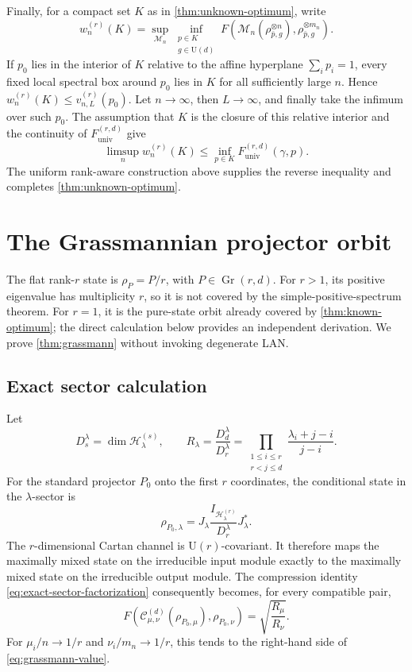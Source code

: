 \documentclass[11pt]{article}
\theoremstyle{remark}
\theoremstyle{plain}
\newcommand{\cC}{\mathcal C}
\newcommand{\cH}{\mathcal H}
\newcommand{\cM}{\mathcal M}
\newcommand{\U}{\mathrm U}
\newcommand{\Gr}{\operatorname{Gr}}
\newcommand{\ot}{\otimes}
\newcommand{\Funiv}{F_{\mathrm{univ}}}
\begin{document}
Finally, for a compact set \(K\) as in \cref{thm:unknown-optimum}, write
\[
  w_n^{(r)}(K)=\sup_{\cM_n}
  \inf_{\substack{p\in K\\g\in\U(d)}}
  F\!\left(\cM_n(\rho_{\bar p,g}^{\ot n}),
             \rho_{\bar p,g}^{\ot m_n}\right).
\]
If \(p_0\) lies in the interior of \(K\) relative to the affine hyperplane
\(\sum_i p_i=1\), every fixed local spectral box around \(p_0\) lies in
\(K\) for all sufficiently large \(n\).  Hence
\(w_n^{(r)}(K)\le v_{n,L}^{(r)}(p_0)\).  Let \(n\to\infty\), then
\(L\to\infty\), and finally take the infimum over such \(p_0\).  The
assumption that \(K\) is the closure of this relative interior and the
continuity of \(\Funiv^{(r,d)}\) give
\[
  \limsup_n w_n^{(r)}(K)
  \le\inf_{p\in K}\Funiv^{(r,d)}(\gamma,p).
\]
The uniform rank-aware construction above supplies the reverse inequality
and completes \cref{thm:unknown-optimum}.

\section{The Grassmannian projector orbit}\label{sec:grassmann}
The flat rank-\(r\) state is \(\rho_P=P/r\), with \(P\in\Gr(r,d)\).  For
\(r>1\), its positive eigenvalue has multiplicity \(r\), so it is not covered
by the simple-positive-spectrum theorem.  For \(r=1\), it is the pure-state
orbit already covered by \cref{thm:known-optimum}; the direct calculation
below provides an independent derivation.  We prove \cref{thm:grassmann}
without invoking degenerate LAN.
\subsection{Exact sector calculation}

Let
\begin{equation}
  D_s^\lambda=\dim\cH_\lambda^{(s)},
  \qquad
  R_\lambda=\frac{D_d^\lambda}{D_r^\lambda}
  =\prod_{\substack{1\le i\le r\\r<j\le d}}
    \frac{\lambda_i+j-i}{j-i}.
  \label{eq:R-lambda}
\end{equation}
For the standard projector \(P_0\) onto the first \(r\) coordinates, the
conditional state in the \(\lambda\)-sector is
\[
  \rho_{P_0,\lambda}
  =J_\lambda\frac{I_{\cH_\lambda^{(r)}}}{D_r^\lambda}J_\lambda^*.
\]
The \(r\)-dimensional Cartan channel is \(\U(r)\)-covariant.  It therefore
maps the maximally mixed state on the irreducible input module exactly to
the maximally mixed state on the irreducible output module.  The compression
identity \eqref{eq:exact-sector-factorization} consequently becomes, for
every compatible pair,
\begin{equation}
  F\!\left(
    \cC_{\mu,\nu}^{(d)}(\rho_{P_0,\mu}),
    \rho_{P_0,\nu}
  \right)
  =\sqrt{\frac{R_\mu}{R_\nu}}.
  \label{eq:grassmann-exact-sector}
\end{equation}
For \(\mu_i/n\to1/r\) and \(\nu_i/m_n\to1/r\), this tends to the
right-hand side of \eqref{eq:grassmann-value}.
\end{document}
